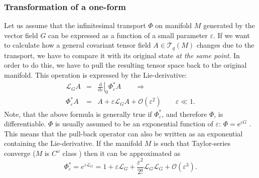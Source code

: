 \documentclass[a4paper,10pt]{article}
\newcommand{\st}[1]{\mathrm{#1}} %
\begin{document}
\subsubsection{Transformation of a one-form}
Let us assume that the infinitesimal transport $\Phi$ on manifold $M$ generated by the vector field $G$ can be expressed as a function of a small parameter $\varepsilon$. If we want to calculate how a general covariant tensor field $A \in \mathcal{T}_q(M)$ changes due to the transport, we have to compare it with its original state \emph{at the same point}. In order to do this, we have to pull the resulting tensor space back to the original manifold. This operation is expressed by the Lie-derivative:
\begin{eqnarray}
	\mathcal{L}_G A &=& \left. \frac{\mathrm{d}}{\mathrm{d} \varepsilon} \right|_0 \Phi^*_{\varepsilon} A  \qquad \Longrightarrow \\
	\Phi^*_{\varepsilon} A &=& A + \varepsilon \mathcal{L}_G A + \mathcal{O}(\varepsilon^2) \qquad \varepsilon \ll 1.
\end{eqnarray}
Note, that the above formula is generally true if $\Phi^*_{\varepsilon}$, and therefore $\Phi$, is differentiable. $\Phi$ is usually assumed to be an exponential function of $\varepsilon$: $\Phi = \st{e}^{\varepsilon G}$ \cite{littlejohn}. This means that the pull-back operator can also be written as an exponential containing the Lie-derivative. If the manifold $M$ is such that Taylor-series converge ($M$ is $C^{\omega}$ class \cite{fecko}) then it can be approximated as
\begin{equation}
	\Phi^*_{\varepsilon} = e^{\varepsilon \mathcal{L}_G} = 1 + \varepsilon \mathcal{L}_G + \frac{\varepsilon^2}{2!} \mathcal{L}_G \mathcal{L}_G + \mathcal{O}(\varepsilon^3).
	\label{eq:pullback_taylor}
\end{equation}
\end{document}
